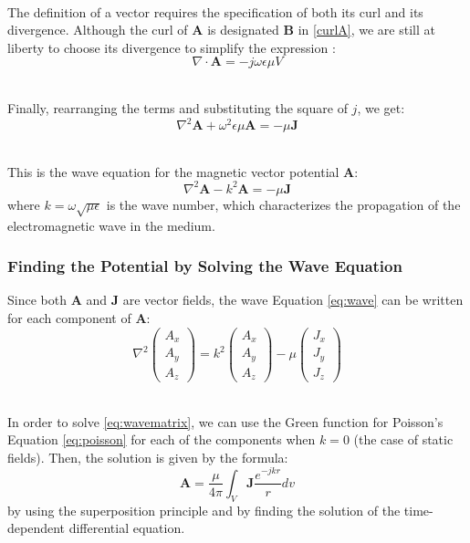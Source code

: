 \documentclass[main]{subfiles}
\begin{document}
\noindent\\
The definition of a vector requires the specification 
of both its curl and its divergence. Although the curl 
of $\mathbf{A}$ is designated $\mathbf{B}$ in 
\ref{curlA}, we are still at liberty to choose its 
divergence to simplify the expression 
\cite{book-magnetism}:
\[
    \nabla \cdot \mathbf{A} = - j \omega \epsilon 
    \mu V
\]

\noindent\\
Finally, rearranging the terms and substituting 
the square of $j$, we get:
\[
    \nabla^2 \mathbf{A} + \omega^2 \epsilon \mu 
 \mathbf{A} = -\mu \mathbf{J}
\]

\noindent\\
This is the wave equation for the magnetic vector 
potential \(\mathbf{A}\):
\begin{equation}
    \nabla^2 \mathbf{A} - k^2 \mathbf{A} = 
 -\mu \mathbf{J}
    \label{eq:wave}
\end{equation}
where \(k = \omega \sqrt{\mu \epsilon}\) is the wave 
number, which characterizes the propagation of the 
electromagnetic wave in the medium.

\subsubsection{Finding the Potential by Solving the Wave Equation}
Since both \(\mathbf{A}\) and \(\mathbf{J}\) are vector 
fields, the wave Equation \eqref{eq:wave} can be written 
for each component of \(\mathbf{A}\):
\begin{equation}
    \nabla^2 
    \begin{pmatrix} 
 A_x \\ A_y \\ A_z 
    \end{pmatrix} = 
 k^2 
    \begin{pmatrix} 
 A_x \\ A_y \\ A_z 
    \end{pmatrix} - 
    \mu 
    \begin{pmatrix} 
 J_x \\ J_y \\ J_z 
    \end{pmatrix}
    \label{eq:wavematrix}
\end{equation}

\noindent\\
In order to solve \ref{eq:wavematrix}, we can use the 
Green function for Poisson's Equation \eqref{eq:poisson} 
for each of the components when $k = 0$ (the case of 
static fields). Then, the solution is given by the 
formula:
\begin{equation}
 \mathbf{A} = \frac{\mu}{4 \pi} \int_V 
 \mathbf{J} \frac{e^{-jkr}}{r} dv
    \label{eq:solA}
\end{equation}
by using the superposition principle and by finding the 
solution of the time-dependent differential equation.
\end{document}
